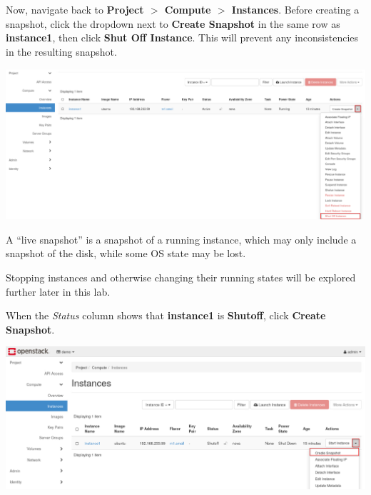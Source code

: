 \documentclass[letterpaper, 12pt]{article}
\begin{document}
\begin{enumerate}
    \begin{labstep}
        Now, navigate back to \textbf{Project $>$ Compute $>$ Instances}.
        Before creating a snapshot, click the dropdown next to \textbf{Create Snapshot} in the same row as \textbf{instance1}, then click \textbf{Shut Off Instance}.
        This will prevent any inconsistencies in the resulting snapshot.

        \begin{center}
            \includegraphics[width=\linewidth]{images/part1/step12.png}
        \end{center}
    \end{labstep}

    \begin{tipbox}
        A ``live snapshot'' is a snapshot of a running instance, which may only include a snapshot of the disk, while some OS state may be lost.
    \end{tipbox}
    \begin{notebox}
        Stopping instances and otherwise changing their running states will be explored further later in this lab.
    \end{notebox}

    \begin{labstep}
        When the \textit{Status} column shows that \textbf{instance1} is \textbf{Shutoff}, click \textbf{Create Snapshot}.

        \begin{center}
            \includegraphics[width=\linewidth]{images/part1/step13.png}
        \end{center}
    \end{labstep}


\end{enumerate}
\end{document}
